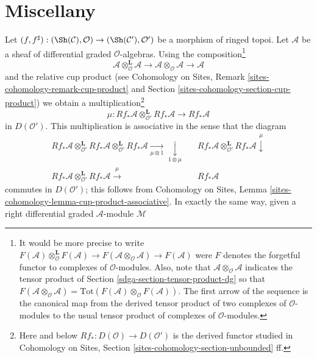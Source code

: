 \section{Miscellany}
\label{sdga-section-misc}
Let $(f, f^\sharp) : (\Sh(\mathcal{C}), \mathcal{O})
\to (\Sh(\mathcal{C}'), \mathcal{O}')$ be a morphism of
ringed topoi. Let $\mathcal{A}$ be a sheaf of differential graded
$\mathcal{O}$-algebras. Using the composition\footnote{It would be
more precise to write
$F(\mathcal{A}) \otimes_\mathcal{O}^\mathbf{L} F(\mathcal{A})
\to F(\mathcal{A} \otimes_\mathcal{O} \mathcal{A}) \to F(\mathcal{A})$
were $F$ denotes the forgetful functor to complexes of $\mathcal{O}$-modules.
Also, note that $\mathcal{A} \otimes_\mathcal{O} \mathcal{A}$ indicates
the tensor product of Section \ref{sdga-section-tensor-product-dg} so that
$F(\mathcal{A} \otimes_\mathcal{O} \mathcal{A}) =
\text{Tot}(F(\mathcal{A}) \otimes_\mathcal{O} F(\mathcal{A}))$.
The first arrow of the sequence is the canonical map from the derived tensor
product of two complexes of $\mathcal{O}$-modules to the usual tensor
product of complexes of $\mathcal{O}$-modules.}
$$
\mathcal{A} \otimes_\mathcal{O}^\mathbf{L} \mathcal{A}
\longrightarrow
\mathcal{A} \otimes_\mathcal{O} \mathcal{A}
\longrightarrow
\mathcal{A}
$$
and the relative cup product (see Cohomology on Sites, Remark
\ref{sites-cohomology-remark-cup-product} and
Section \ref{sites-cohomology-section-cup-product})
we obtain a multiplication\footnote{Here and below
$Rf_* : D(\mathcal{O}) \to D(\mathcal{O}')$ is the derived
functor studied in
Cohomology on Sites, Section \ref{sites-cohomology-section-unbounded} ff.}
$$
\mu :
Rf_*\mathcal{A} \otimes_{\mathcal{O}'}^\mathbf{L} Rf_*\mathcal{A}
\longrightarrow
Rf_*\mathcal{A}
$$
in $D(\mathcal{O}')$. This multiplication is associative in the sense
that the diagram
$$
\begin{array}{ccc}Rf_*\mathcal{A} \otimes_{\mathcal{O}'}^\mathbf{L} Rf_*\mathcal{A}
\otimes_{\mathcal{O}'}^\mathbf{L} Rf_*\mathcal{A}
\underset{\mu \otimes 1}{\longrightarrow}\underset{1 \otimes \mu}{\downarrow} &  & Rf_*\mathcal{A} \otimes_{\mathcal{O}'}^\mathbf{L} Rf_*\mathcal{A}
\overset{\mu}{\downarrow} \\ Rf_*\mathcal{A} \otimes_{\mathcal{O}'}^\mathbf{L} Rf_*\mathcal{A}
\overset{\mu}{\longrightarrow} &  & Rf_*\mathcal{A}\end{array}
$$
commutes in $D(\mathcal{O}')$; this follows from
Cohomology on Sites, Lemma \ref{sites-cohomology-lemma-cup-product-associative}.
In exactly the same way, given a
right differential graded $\mathcal{A}$-module $\mathcal{M}$
